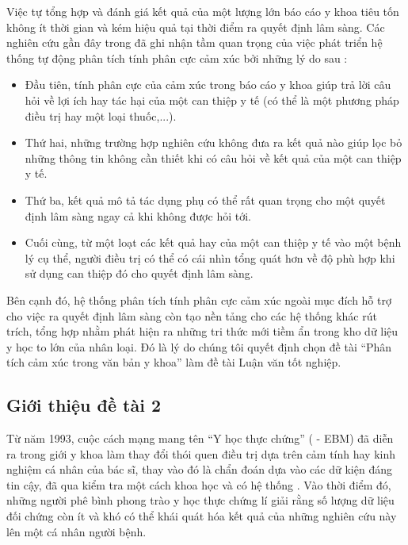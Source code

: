 Việc tự tổng hợp và đánh giá kết quả của một lượng lớn báo cáo y khoa tiêu tốn không ít thời gian và kém hiệu quả tại thời điểm ra quyết định lâm sàng. Các nghiên cứu gần đây trong \cite{medhat2014sentiment} đã ghi nhận tầm quan trọng của việc phát triển hệ thống tự động phân tích tính phân cực cảm xúc bởi những lý do sau \cite{niu2005analysis}: 
\begin{itemize}
\item Đầu tiên, tính phân cực của cảm xúc trong báo cáo y khoa giúp trả lời câu hỏi về lợi ích hay tác hại của một can thiệp y tế (có thể là một phương pháp điều trị hay một loại thuốc,...).
\item Thứ hai, những trường hợp nghiên cứu không đưa ra kết quả nào giúp lọc bỏ những thông tin không cần thiết khi có câu hỏi về kết quả của một can thiệp y tế.
\item Thứ ba, kết quả \tieucuc mô tả tác dụng phụ có thể rất quan trọng cho một quyết định lâm sàng ngay cả khi không được hỏi tới.
\item Cuối cùng, từ một loạt các kết quả \tichcuc hay \tieucuc của một can thiệp y tế vào một bệnh lý cụ thể, người điều trị có thể có cái nhìn tổng quát hơn về độ phù hợp khi sử dụng can thiệp đó cho quyết định lâm sàng.
\end{itemize}

Bên cạnh đó, hệ thống phân tích tính phân cực cảm xúc ngoài mục đích hỗ trợ cho việc ra quyết định lâm sàng còn tạo nền tảng cho các hệ thống khác rút trích, tổng hợp nhằm phát hiện ra những tri thức mới tiềm ẩn trong kho dữ liệu y học to lớn của nhân loại. Đó là lý do chúng tôi quyết định chọn đề tài ``Phân tích cảm xúc trong văn bản y khoa'' làm đề tài Luận văn tốt nghiệp.

\subsection{Giới thiệu đề tài 2}
Từ năm 1993, cuộc cách mạng mang tên ``Y học thực chứng'' ( - EBM) đã diễn ra trong giới y khoa làm thay đổi thói quen điều trị dựa trên cảm tính hay kinh nghiệm cá nhân của bác sĩ, thay vào đó là chẩn đoán dựa vào các dữ kiện đáng tin cậy, đã qua kiểm tra một cách khoa học và có hệ thống \cite{Nguyen2004}. Vào thời điểm đó, những người phê bình phong trào y học thực chứng lí giải rằng số lượng dữ liệu đối chứng còn ít và khó có thể khái quát hóa kết quả của những nghiên cứu này lên một cá nhân người bệnh.\\

